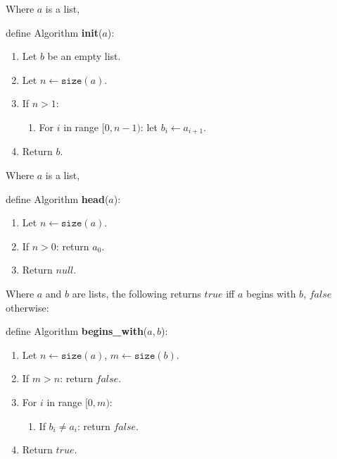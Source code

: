  \begin{framed}

  Where $a$ is a list,

 \vspace{12pt}

 define Algorithm \textbf{init}($a$):
 
  \begin{enumerate}
    \item Let $b$ be an empty list.
    \item Let $n \leftarrow \texttt{size}(a)$.
    \item If $n > 1$:
    \begin{enumerate} 
      \item For $i$ in range $[0, n-1)$: let $b_{i} \leftarrow a_{i+1}$.
    \end{enumerate} 
    \item Return $b$.
  \end{enumerate} 

 \end{framed}


 \begin{framed}

  Where $a$ is a list,

 \vspace{12pt}

 define Algorithm \textbf{head}($a$):
 
  \begin{enumerate}
    \item Let $n \leftarrow \texttt{size}(a)$.
    \item If $n > 0$: return $a_0$.
    \item Return $null$.
  \end{enumerate} 

 \end{framed}

 \begin{framed}
  Where $a$ and $b$ are lists, the following returns $true$
  iff $a$ begins with $b$, $false$ otherwise:

  \vspace{12pt}

  define Algorithm \textbf{begins\_with}($a, b$):
 
  \begin{enumerate}
   \item Let $n \leftarrow \texttt{size}(a)$, $m \leftarrow \texttt{size}(b)$.
   \item If $m > n$: return $false$.
   \item For $i$ in range $[0, m)$:
   \begin{enumerate}
     \item If $b_i \not= a_i$: return $false$.
   \end{enumerate} 
   \item Return $true$.
  \end{enumerate}
 \end{framed}


